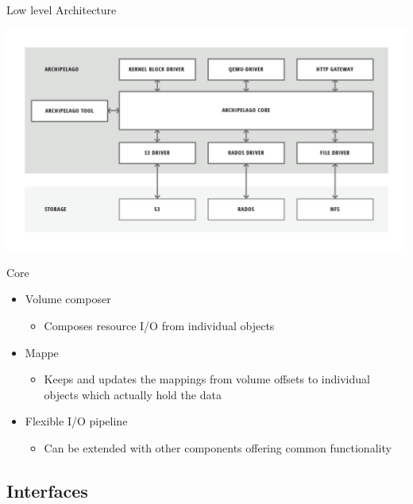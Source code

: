 \documentclass[utf8]{beamer}
\begin{document}
\begin{frame}{Low level Architecture}
  \begin{center}
    \includegraphics[width=.90\linewidth]{figures/low-architecture.png}
  \end{center}
\end{frame}

\begin{frame}{Core}
  \begin{itemize}
    \item Volume composer
      \begin{itemize}
      \item Composes resource I/O from individual objects
      \end{itemize}
    \item Mappe
      \begin{itemize}
      \item Keeps and updates the mappings from volume offsets to
        individual objects which actually hold the data 
      \end{itemize}
    \item Flexible I/O pipeline
      \begin{itemize}
      \item Can be extended with other components offering common
        functionality 
      \end{itemize}   
  \end{itemize}
\end{frame}

\subsection{Interfaces}
\end{document}
